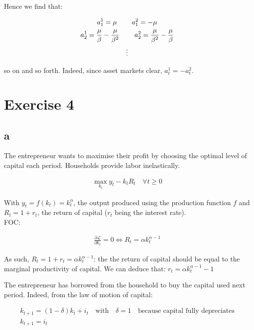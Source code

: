 \documentclass{article}
\begin{document}
Hence we find that:

\begin{gather*}
    a^1_1 = \mu \mbox{\hspace{0.3in}} a^2_1 = -\mu \\
    a^1_2 = \frac{\mu}{\beta}-\frac{\mu}{\beta^2} \mbox{\hspace{0.3in}} a^2_2 = \frac{\mu}{\beta^2}-\frac{\mu}{\beta} \\
    \vdots
\end{gather*}

so on and so forth. Indeed, since asset markets clear, $a^1_t = -a^2_t$.

\color{black}

\newpage

\section{Exercise 4}
\subsection{a}
The entrepreneur wants to maximise their profit by choosing the optimal level of capital each period. Households provide labor inelastically.

\begin{gather*}
    \max_{k_t} y_t-k_tR_t\quad\forall t\geq 0
\end{gather*}

With $y_t=f(k_t)=k_t^{\alpha}$, the output produced using the production function $f$ and $R_t=1+r_t$, the return of capital ($r_t$ being the interest rate). \\

FOC:

\begin{gather*}
    \frac{\partial \mathcal{L}}{\partial k_t}=0 \Leftrightarrow R_t=\alpha k_t^{\alpha-1}
\end{gather*}

As such, $R_t=1+r_t=\alpha k_t^{\alpha-1}$: the the return of capital should be equal to the marginal productivity of capital. We can deduce that: $r_t=\alpha k_t^{\alpha-1}-1$

The entrepreneur has borrowed from the household to buy the capital used next period. Indeed, from the law of motion of capital:

\begin{gather*}
    k_{t+1}=(1-\delta)k_t+i_t\quad\mbox{with}\quad\delta=1\quad\mbox{because capital fully depreciates}\\
    k_{t+1}=i_t
\end{gather*}
\end{document}
